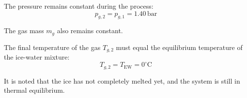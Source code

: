 The pressure remains constant during the process:  
\[
p_{g,2} = p_{g,1} = 1.40 \, \text{bar}
\]  

The gas mass \( m_g \) also remains constant.  

The final temperature of the gas \( T_{g,2} \) must equal the equilibrium temperature of the ice-water mixture:  
\[
T_{g,2} = T_{\text{EW}} = 0^\circ\text{C}
\]  

It is noted that the ice has not completely melted yet, and the system is still in thermal equilibrium.